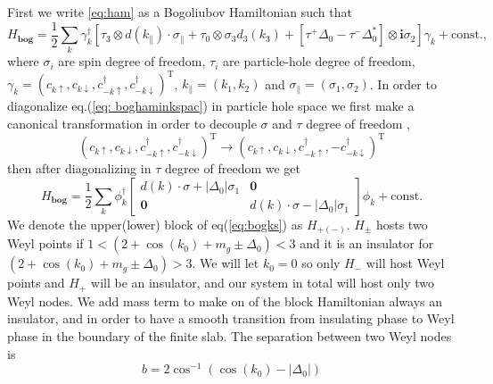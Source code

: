 \documentclass[%
 preprint,
 amsmath,amssymb,
 aps,
]{revtex4-1}
\begin{document}
First we write \ref{eq:ham} as a Bogoliubov Hamiltonian such that
\begin{equation}
H_\textbf{bog}=\frac{1}{2}\sum_{k}\gamma^{\dagger}_{k}[\tau_3\otimes d({k_\parallel})\cdot\sigma_{\parallel}+\tau_0\otimes\sigma_3 d_3(k_3)+[\tau^{+}\Delta_0-\tau^{-}\Delta_0^*]\otimes \textbf{i}\sigma_2]\gamma_{k}+\text{const.}, \label{eq: boghaminkspac}
\end{equation}
where $\sigma_i$ are spin degree of freedom, $\tau_i$ are particle-hole degree of freedom, $\gamma_{k}=(c_{k\uparrow},c_{k\downarrow},c^{\dagger}_{-k\uparrow},c^{\dagger}_{-k\downarrow})^{\text{T}}$, $k_{\parallel}=(k_1,k_2)$ and $\sigma_{\parallel}=(\sigma_1,\sigma_2)$. In order to diagonalize eq.(\ref{eq: boghaminkspac}) in particle hole space we first make a canonical transformation in order to decouple $\sigma$ and $\tau $ degree of freedom , 
\begin{equation}
(c_{k\uparrow},c_{k\downarrow},c^{\dagger}_{-k\uparrow},c^{\dagger}_{-k\downarrow})^{\text{T}}\rightarrow (c_{k\uparrow},c_{k\downarrow},c^{\dagger}_{-k\uparrow},-c^{\dagger}_{-k\downarrow})^{\text{T}}
\end{equation}
then after diagonalizing in $\tau$ degree of freedom we get 
\begin{equation}
H_{\textbf{bog}}=\frac{1}{2}\sum_{k}\phi^{\dagger}_{k}\begin{bmatrix}
    d(k)\cdot \sigma+|\Delta_0|\sigma_1 & \mathbf{0} \\
    \mathbf{0} & d(k)\cdot \sigma-|\Delta_0|\sigma_1 
\end{bmatrix} \phi_{k} +\text{const.}\label{eq:bogks}
\end{equation}
We denote the upper(lower) block of eq(\ref{eq:bogks}) as $H_{+(-)}$. $H_{\pm}$ hosts two Weyl points  if $1<(2+\cos(k_0)+m_g\pm\Delta_0)<3$ and it is an insulator for $(2+\cos(k_0)+m_g\pm\Delta_0)>3$. We will let $k_0=0$ so only $H_{-}$ will host Weyl points and $H_{+}$ will be an insulator, and our system in total will host only two Weyl nodes. We add mass term to make on of the block Hamiltonian always an insulator, and in order to have a smooth transition from insulating phase to Weyl phase in the boundary of the finite slab.  The separation between two Weyl nodes is
\begin{equation}
b=2\cos^{-1}(\cos(k_0)-|\Delta_0|)
\end{equation}
\end{document}

